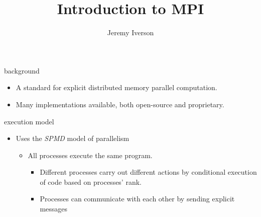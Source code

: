 \documentclass[10pt,t]{beamer}
\title{Introduction to MPI}
\date{}
\author{Jeremy Iverson}
\institute{College of Saint Benedict \& Saint John's University}
\begin{document}
  \maketitle

  \begin{frame}{background}
    \begin{center}
    \end{center}

    \begin{itemize}
      \item A standard for explicit distributed memory parallel computation.
      \item Many implementations available, both open-source and proprietary.
    \end{itemize}

  \end{frame}


  \begin{frame}{execution model}
    \begin{itemize}
      \item Uses the \emph{SPMD} model of parallelism
        \begin{itemize}
          \item All processes execute the same program.
            \begin{itemize}
              \item Different processes carry out different actions by
                conditional execution of code based on processes' rank.
              \item Processes can communicate with each other by sending
                explicit messages
            \end{itemize}
        \end{itemize}
    \end{itemize}
  \end{frame}
\end{document}
